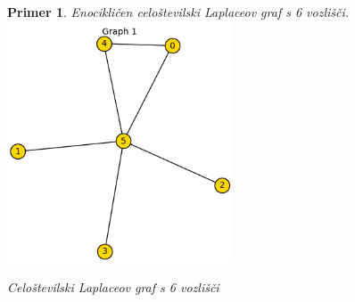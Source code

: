 \documentclass{article}
\newtheorem{primer}{Primer}
\begin{document}
\begin{primer}
Enocikličen celoštevilski Laplaceov graf s 6 vozlišči. \\
        \centering
        \includegraphics[width=0.5\textwidth]{primer_6.png}
        \caption{Celoštevilski Laplaceov graf s 6 vozlišči}
       
   
\end{primer}
\end{document}
